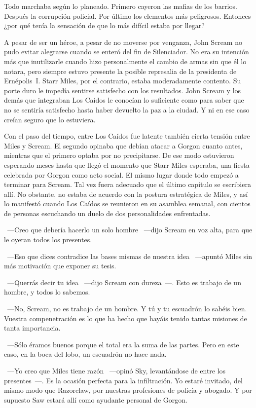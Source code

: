 Todo marchaba según lo planeado. Primero cayeron las mafias de los barrios. Después la corrupción policial. Por último los elementos más peligrosos. Entonces ¿por qué tenía la sensación de que lo más difícil estaba por llegar?

\fancyparbreak
A pesar de ser un héroe, a pesar de no moverse por venganza, John Scream no pudo evitar alegrarse cuando se enteró del fin de Silenciador. No era su intención más que inutilizarle cuando hizo personalmente el cambio de armas sin que él lo notara, pero siempre estuvo presente la posible represalia de la presidenta de Ernépolis~I. Starr Miles, por el contrario, estaba moderadamente contento. Su porte duro le impedía sentirse satisfecho con los resultados. John Scream y los demás que integraban Los Caídos le conocían lo suficiente como para saber que no se sentiría satisfecho hasta haber devuelto la paz a la ciudad. Y ni en ese caso creían seguro que lo estuviera.

Con el paso del tiempo, entre Los Caídos fue latente también cierta tensión entre Miles y Scream. El segundo opinaba que debían atacar a Gorgon cuanto antes, mientras que el primero optaba por no precipitarse. De ese modo estuvieron esperando meses hasta que llegó el momento que Starr Miles esperaba, una fiesta celebrada por Gorgon como acto social. El mismo lugar donde todo empezó a terminar para Scream. Tal vez fuera adecuado que el último capítulo se escribiera allí. No obstante, no estaba de acuerdo con la postura estratégica de Miles, y así lo manifestó cuando Los Caídos se reunieron en su asamblea semanal, con cientos de personas escuchando un duelo de dos personalidades enfrentadas.

~---Creo que debería hacerlo un solo hombre ~---dijo Scream en voz alta, para que le oyeran todos los presentes.

~---Eso que dices contradice las bases mismas de nuestra idea ~---apuntó Miles sin más motivación que exponer su tesis.

~---Querrás decir tu idea ~---dijo Scream con dureza~---. Esto es trabajo de un hombre, y todos lo sabemos.

~---No, Scream, no es trabajo de un hombre. Y tú y tu escuadrón lo sabéis bien. Vuestra compenetración es lo que ha hecho que hayáis tenido tantas misiones de tanta importancia.

~---Sólo éramos buenos porque el total era la suma de las partes. Pero en este caso, en la boca del lobo, un escuadrón no hace nada.

~---Yo creo que Miles tiene razón ~---opinó Sky, levantándose de entre los presentes~---. Es la ocasión perfecta para la infiltración. Yo estaré invitado, del mismo modo que Razorclaw, por nuestras profesiones de policía y abogado. Y por supuesto Saw estará allí como ayudante personal de Gorgon.

